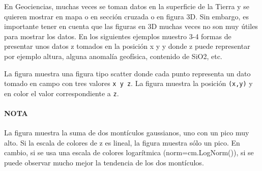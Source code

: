 \documentclass[11pt]{article}
\begin{document}
En Geociencias, muchas veces se toman datos en la superficie de la
Tierra y se quieren mostrar en mapa o en sección cruzada o en figura 3D.
Sin embargo, es importante tener en cuenta que las figuras en 3D muchas
veces no son muy útiles para mostrar los datos. En los siguientes
ejemplos muestro 3-4 formas de presentar unos datos z tomados en la
posición x y y donde z puede representar por ejemplo altura, alguna
anomalía geofísica, contenido de SiO2, etc.

La figura muestra una figura tipo scatter donde cada punto representa un
dato tomado en campo con tres valores \texttt{x\ y\ z}. La figura
muestra la posición \texttt{(x,y)} y en color el valor correspondiente a
\texttt{z}.

\hypertarget{nota}{%
\paragraph{NOTA}\label{nota}}

La figura muestra la suma de dos montículos gaussianos, uno con un pico
muy alto. Si la escala de colores de z es lineal, la figura muestra sólo
un pico. En cambio, si se usa una escala de colores logarítmica
(norm=cm.LogNorm()), si se puede observar mucho mejor la tendencia de
los dos montículos.
\end{document}
